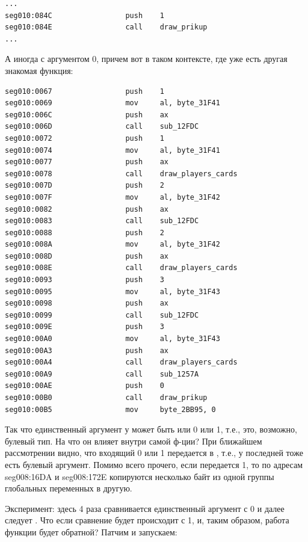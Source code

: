 \begin{lstlisting}
...
seg010:084C                 push    1
seg010:084E                 call    draw_prikup
...
\end{lstlisting}

А иногда с аргументом 0, причем вот в таком контексте, где уже есть другая знакомая функция:

\begin{lstlisting}
seg010:0067                 push    1
seg010:0069                 mov     al, byte_31F41
seg010:006C                 push    ax
seg010:006D                 call    sub_12FDC
seg010:0072                 push    1
seg010:0074                 mov     al, byte_31F41
seg010:0077                 push    ax
seg010:0078                 call    draw_players_cards
seg010:007D                 push    2
seg010:007F                 mov     al, byte_31F42
seg010:0082                 push    ax
seg010:0083                 call    sub_12FDC
seg010:0088                 push    2
seg010:008A                 mov     al, byte_31F42
seg010:008D                 push    ax
seg010:008E                 call    draw_players_cards
seg010:0093                 push    3
seg010:0095                 mov     al, byte_31F43
seg010:0098                 push    ax
seg010:0099                 call    sub_12FDC
seg010:009E                 push    3
seg010:00A0                 mov     al, byte_31F43
seg010:00A3                 push    ax
seg010:00A4                 call    draw_players_cards
seg010:00A9                 call    sub_1257A
seg010:00AE                 push    0
seg010:00B0                 call    draw_prikup
seg010:00B5                 mov     byte_2BB95, 0
\end{lstlisting}

Так что единственный аргумент у  может быть или 0 или 1, т.е., это, возможно, булевый тип.
На что он влияет внутри самой ф-ции?
При ближайшем рассмотрении видно, что входящий 0 или 1 передается в , т.е., у последней тоже есть
булевый аргумент.
Помимо всего прочего, если передается 1, то по адресам seg008:16DA и seg008:172E копируются несколько байт
из одной группы глобальных переменных в другую.

Эксперимент: здесь 4 раза сравнивается единственный аргумент с 0 и далее следует .
Что если сравнение будет происходит с 1, и, таким образом, работа функции  будет обратной?
Патчим и запускаем:

